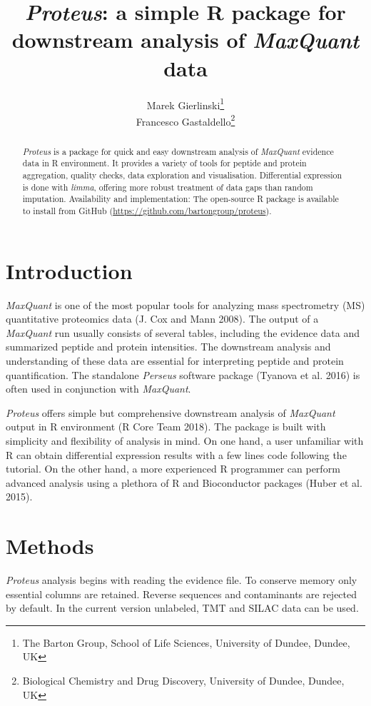 \documentclass[]{article}
\title{\emph{Proteus}: a simple R package for downstream analysis of
\emph{MaxQuant} data}
\author{Marek Gierlinski\footnote{The Barton Group, School of Life Sciences,
  University of Dundee, Dundee, UK} \\ Francesco Gastaldello\footnote{Biological Chemistry and Drug Discovery,
  University of Dundee, Dundee, UK}}
\date{}
\begin{document}
\maketitle
\begin{abstract}
\emph{Proteus} is a package for quick and easy downstream analysis of
\emph{MaxQuant} evidence data in R environment. It provides a variety of
tools for peptide and protein aggregation, quality checks, data
exploration and visualisation. Differential expression is done with
\emph{limma}, offering more robust treatment of data gaps than random
imputation. Availability and implementation: The open-source R package
is available to install from GitHub
(\url{https://github.com/bartongroup/proteus}).
\end{abstract}

\section{Introduction}\label{introduction}

\emph{MaxQuant} is one of the most popular tools for analyzing mass
spectrometry (MS) quantitative proteomics data (J. Cox and Mann 2008).
The output of a \emph{MaxQuant} run usually consists of several tables,
including the evidence data and summarized peptide and protein
intensities. The downstream analysis and understanding of these data are
essential for interpreting peptide and protein quantification. The
standalone \emph{Perseus} software package (Tyanova et al. 2016) is
often used in conjunction with \emph{MaxQuant}.

\emph{Proteus} offers simple but comprehensive downstream analysis of
\emph{MaxQuant} output in R environment (R Core Team 2018). The package
is built with simplicity and flexibility of analysis in mind. On one
hand, a user unfamiliar with R can obtain differential expression
results with a few lines code following the tutorial. On the other hand,
a more experienced R programmer can perform advanced analysis using a
plethora of R and Bioconductor packages (Huber et al. 2015).

\section{Methods}\label{methods}

\emph{Proteus} analysis begins with reading the evidence file. To
conserve memory only essential columns are retained. Reverse sequences
and contaminants are rejected by default. In the current version
unlabeled, TMT and SILAC data can be used.
\end{document}
